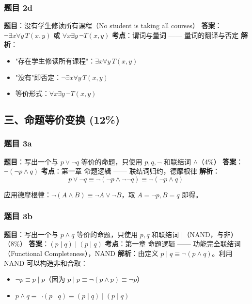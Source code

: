 \documentclass[10pt,a4paper,openany]{ctexbook}
\theoremstyle{definition}
\theoremstyle{remark}
\begin{document}
\subsubsection{题目 2d}

\textbf{题目}：没有学生修读所有课程（No student is taking all courses）
\textbf{答案}：$\neg \exists x \forall y\, T(x,y)$ 或 $\forall x \exists y\, \neg T(x,y)$
\textbf{考点}：谓词与量词 —— 量词的翻译与否定
\textbf{解析}：
\begin{itemize}
\item "存在学生修读所有课程"：$\exists x \forall y\, T(x,y)$
\item "没有"即否定：$\neg \exists x \forall y\, T(x,y)$
\item 等价形式：$\forall x \exists y\, \neg T(x,y)$

\end{itemize}

\vspace{-2pt}

\subsection{三、命题等价变换 (12\%)}

\subsubsection{题目 3a}

\textbf{题目}：写出一个与 $p \lor \neg q$ 等价的命题，只使用 $p, q, \neg$ 和联结词 $\land$（4\%）
\textbf{答案}：$\neg (\neg p \land q)$
\textbf{考点}：第一章 命题逻辑 —— 联结词归约，德摩根律
\textbf{解析}：
\[
p \lor \neg q \equiv \neg(\neg p \land \neg\neg q) \equiv \neg(\neg p \land q)
\]

应用德摩根律：$\neg(A \land B) \equiv \neg A \lor \neg B$，取 $A = \neg p, B = q$ 即得。
\vspace{-2pt}

\subsubsection{题目 3b}

\textbf{题目}：写出一个与 $p \land q$ 等价的命题，只使用 $p, q$ 和联结词 $|$（NAND，与非）（8\%）
\textbf{答案}：$(p \mid q) \mid (p \mid q)$
\textbf{考点}：第一章 命题逻辑 —— 功能完全联结词（Functional Completeness），NAND
\textbf{解析}：由定义 $p \mid q \equiv \neg(p \land q)$。利用 NAND 可以构造非和合取：
\begin{itemize}
\item $\neg p \equiv p \mid p$（因为 $p \mid p \equiv \neg(p \land p) \equiv \neg p$）
\item $p \land q \equiv \neg(p \mid q) \equiv (p \mid q) \mid (p \mid q)$

\end{itemize}
\end{document}
